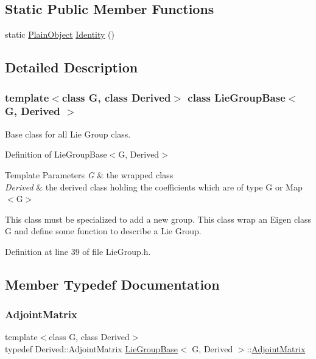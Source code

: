 \subsection*{Static Public Member Functions}
\begin{DoxyCompactItemize}
\item 
static \hyperlink{class_lie_group_base_a37b1d64048a2fa65b298801f6028c468}{Plain\+Object} \hyperlink{class_lie_group_base_a3a034860d2bfef95e9a1be039ae819ae}{Identity} ()
\end{DoxyCompactItemize}


\subsection{Detailed Description}
\subsubsection*{template$<$class G, class Derived$>$\newline
class Lie\+Group\+Base$<$ G, Derived $>$}

Base class for all Lie Group class. 

Definition of Lie\+Group\+Base$<$\+G, Derived$>$


\begin{DoxyTemplParams}{Template Parameters}
{\em G} & the wrapped class \\
\hline
{\em Derived} & the derived class holding the coefficients which are of type G or Map$<$\+G$>$\\
\hline
\end{DoxyTemplParams}
This class must be specialized to add a new group. This class wrap an Eigen class G and define some function to describe a Lie Group. 

Definition at line 39 of file Lie\+Group.\+h.



\subsection{Member Typedef Documentation}
\hypertarget{class_lie_group_base_ab310fae7cfc1fe04e9d286403f2d4211}{}\label{class_lie_group_base_ab310fae7cfc1fe04e9d286403f2d4211} 
\subsubsection{\texorpdfstring{Adjoint\+Matrix}{AdjointMatrix}}
{\footnotesize\ttfamily template$<$class G, class Derived$>$ \\
typedef Derived\+::\+Adjoint\+Matrix \hyperlink{class_lie_group_base}{Lie\+Group\+Base}$<$ G, Derived $>$\+::\hyperlink{class_lie_group_base_ab310fae7cfc1fe04e9d286403f2d4211}{Adjoint\+Matrix}}

